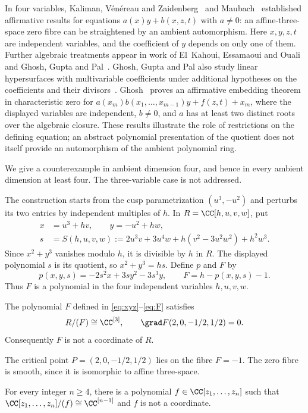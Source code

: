 In four variables, Kaliman, V\'en\'ereau and Zaidenberg~\cite[Theorem~4.2(a)]{KVZ}
and Maubach~\cite[Corollaries~4.2--4.3]{Maubach} established affirmative results
for equations $a(x)y+b(x,z,t)$ with $a\ne0$: an affine-three-space zero fibre
can be straightened by an ambient automorphism. Here $x,y,z,t$ are independent
variables, and the coefficient of $y$ depends on only one of them.
Further algebraic treatments appear in work of El~Kahoui, Essamaoui and
Ouali~\cite{EEO} and Ghosh, Gupta and Pal~\cite{GGPthreefold}.
Ghosh, Gupta and Pal also study linear hypersurfaces with multivariable
coefficients under additional hypotheses on the coefficients and their
divisors~\cite[Theorem~4.11]{GGP}.
Ghosh~\cite[Theorem~1.4]{Ghosh} proves an affirmative embedding theorem in
characteristic zero for
$a(x_m)b(x_1,\ldots,x_{m-1})y+f(z,t)+x_m$, where the displayed variables are
independent, $b\ne0$, and $a$ has at least two distinct roots over the algebraic
closure.
These results illustrate the role of restrictions on the defining equation;
an abstract polynomial presentation of the quotient does not itself provide
an automorphism of the ambient polynomial ring.

We give a counterexample in ambient dimension four, and hence in every
ambient dimension at least four. The three-variable case is not addressed.

The construction starts from the cusp parametrization $(u^3,-u^2)$ and
perturbs its two entries by independent multiples of $h$.
In $R=\CC[h,u,v,w]$, put
\begin{equation}\label{eq:xyz}
  \begin{aligned}
    x&=u^3+hv,\qquad y=-u^2+hw,\\
    s&=S(h,u,v,w)
       :=2u^3v+3u^4w+h(v^2-3u^2w^2)+h^2w^3.
  \end{aligned}
\end{equation}
Since $x^2+y^3$ vanishes modulo $h$, it is divisible by $h$ in $R$.
The displayed polynomial $s$ is its quotient, so $x^2+y^3=hs$.
Define $p$ and $F$ by
\begin{equation}
  p(x,y,s)=-2s^2x+3sy^2-3s^3y,
  \qquad F=h-p(x,y,s)-1. \label{eq:F}
\end{equation}
Thus $F$ is a polynomial in the four independent variables $h,u,v,w$.

\begin{theorem}\label{thm:main}
The polynomial $F$ defined in \eqref{eq:xyz}--\eqref{eq:F} satisfies
\[
  R/(F)\cong\CC^{[3]},
  \qquad
  \grad F(2,0,-1/2,1/2)=0.
\]
Consequently $F$ is not a coordinate of $R$.
\end{theorem}

The critical point $P=(2,0,-1/2,1/2)$ lies on the fibre $F=-1$.
The zero fibre is smooth, since it is isomorphic to affine three-space.

\begin{corollary}\label{cor:dimension}
For every integer $n\ge4$, there is a polynomial
$f\in\CC[z_1,\ldots,z_n]$ such that
$\CC[z_1,\ldots,z_n]/(f)\cong\CC^{[n-1]}$ and $f$ is not a coordinate.
\end{corollary}

